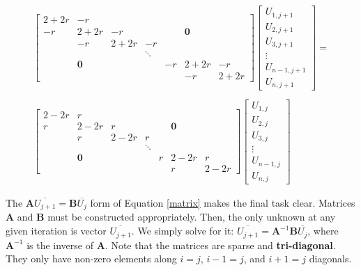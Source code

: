 \documentclass[12pt, letterpaper]{article}
\begin{document}
\begin{equation}
  \label{matrix}
  \begin{array}{c}
  \begin{bmatrix}
    2+2r & -r   & & & & &\\
    -r   & 2+2r & -r & & &\mathbf{0} &\\
         &   -r & 2+2r & -r & & &\\
         & & & \ddots & & &\\     
     & \mathbf{0}& & & -r   & 2+2r & -r \\
     & & & & &   -r & 2+2r
  \end{bmatrix}
  \begin{bmatrix}
    U_{1,j+1} \\ U_{2,j+1}\\U_{3,j+1}\\ \vdots \\U_{n-1,j+1} \\ U_{n,j+1}
  \end{bmatrix}
  =\\
  \\
  \begin{bmatrix}
    2-2r & r   & & & & &\\
    r   & 2-2r & r & & &\mathbf{0} &\\
    &   r & 2-2r & r & & &\\
    & & & \ddots & & &\\     
    & \mathbf{0}& & & r   & 2-2r & r \\
    & & & & &   r & 2-2r
  \end{bmatrix}
  \begin{bmatrix}
    U_{1,j} \\ U_{2,j}\\U_{3,j}\\ \vdots \\U_{n-1,j} \\ U_{n,j}
  \end{bmatrix}
  \end{array}
\end{equation}

The $\mathbf{A}\overline{U_{j+1}} = \mathbf{B}\overline{U_{j}}$ form of Equation 
\ref{matrix} makes the final task clear.  Matrices $\mathbf{A}$ and $\mathbf{B}$
must be constructed appropriately.  Then, the only unknown at any given 
iteration is vector $\overline{U_{j+1}}$.  We simply solve for it: 
$\overline{U_{j+1}} =\mathbf{A}^{-1}\mathbf{B}\overline{U_{j}}$, where 
$\mathbf{A}^{-1}$ is the inverse of $\mathbf{A}$.
  Note that the matrices are sparse and \textbf{tri-diagonal}.  They only have
non-zero elements along $i=j$, $i-1=j$, and $i+1=j$ diagonals.

\end{document}
